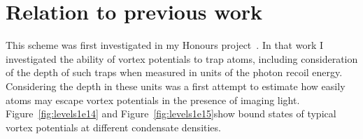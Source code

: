 \section{Relation to previous work}

This scheme was first investigated in my Honours project~\cite{billington_particle_2010}. In that work I investigated the ability of vortex potentials to trap atoms, including consideration of the depth of such traps when measured in units of the photon recoil energy. Considering the depth in these units was a first attempt to estimate how easily atoms may escape vortex potentials in the presence of imaging light. Figure~\ref{fig:levels1e14} and Figure~\ref{fig:levels1e15}show bound states of typical vortex potentials at different condensate densities.

\begin{figure}
\centering
\noindent{}
\noindent{}
\end{figure}
